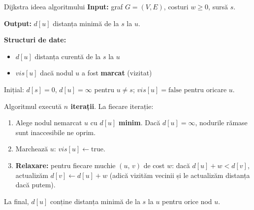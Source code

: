 \documentclass[10pt]{beamer}
\begin{document}
\begin{frame}{Dijkstra \textemdash{} ideea algoritmului}
  \textbf{Input:} graf $G=(V,E)$, costuri $w\geq 0$, sursă $s$.
  
  \textbf{Output:} $d[u]$ \textemdash{} distanța minimă de la $s$ la $u$.

  \smallskip
  \textbf{Structuri de date:}
  \begin{itemize}
    \item $d[u]$ \textemdash{} distanța curentă de la $s$ la $u$
    \item $vis[u]$ \textemdash{} dacă nodul $u$ a fost \textbf{marcat} (vizitat)
  \end{itemize}

  Inițial: $d[s]=0$, $d[u]=\infty$ pentru $u\neq s$; $vis[u]=\text{false}$ pentru oricare $u$.

  \smallskip

  Algoritmul execută \textbf{$n$ iterații}. La fiecare iterație:
  \begin{enumerate}
    \item Alege nodul nemarcat $u$ cu $d[u]$ \textbf{minim}.
          Dacă $d[u]=\infty$, nodurile rămase sunt inaccesibile \textemdash{} ne oprim.
    \item Marchează $u$: $vis[u] \leftarrow \text{true}$.
    \item \textbf{Relaxare:} pentru fiecare muchie $(u,\,v)$ de cost $w$:
          dacă $d[u]+w < d[v]$, actualizăm $d[v] \leftarrow d[u]+w$ (adică vizităm vecinii și le actualizăm distanța dacă putem).
  \end{enumerate}

  La final, $d[u]$ conține distanța minimă de la $s$ la $u$ pentru orice nod $u$.
\end{frame}
\end{document}
